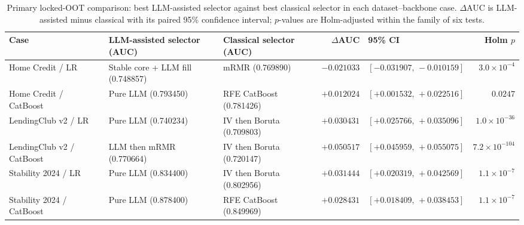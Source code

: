 \documentclass[preprint,12pt]{elsarticle}
\begin{document}
\begin{table}
\centering
\scriptsize
\setlength{\tabcolsep}{4pt}
\begin{threeparttable}
\caption{Primary locked-OOT comparison: best LLM-assisted selector against best classical selector in each dataset--backbone case. $\Delta$AUC is LLM-assisted minus classical with its paired 95\% confidence interval; $p$-values are Holm-adjusted within the family of six tests.}
\label{tab:primary_results}
\begin{tabular}{@{}lllrlr@{}}
\toprule
Case & LLM-assisted selector (AUC) & Classical selector (AUC) & $\Delta$AUC & 95\% CI & Holm $p$ \\
\midrule
Home Credit / LR & Stable core + LLM fill (0.748857) & mRMR (0.769890) & $-0.021033$ & $[-0.031907,\,-0.010159]$ & $3.0\times10^{-4}$ \\
Home Credit / CatBoost & Pure LLM (0.793450) & RFE CatBoost (0.781426) & $+0.012024$ & $[+0.001532,\,+0.022516]$ & $0.0247$ \\
LendingClub v2 / LR & Pure LLM (0.740234) & IV then Boruta (0.709803) & $+0.030431$ & $[+0.025766,\,+0.035096]$ & $1.0\times10^{-36}$ \\
LendingClub v2 / CatBoost & LLM then mRMR (0.770664) & IV then Boruta (0.720147) & $+0.050517$ & $[+0.045959,\,+0.055075]$ & $7.2\times10^{-104}$ \\
Stability 2024 / LR & Pure LLM (0.834400) & IV then Boruta (0.802956) & $+0.031444$ & $[+0.020319,\,+0.042569]$ & $1.1\times10^{-7}$ \\
Stability 2024 / CatBoost & Pure LLM (0.878400) & RFE CatBoost (0.849969) & $+0.028431$ & $[+0.018409,\,+0.038453]$ & $1.1\times10^{-7}$ \\
\bottomrule
\end{tabular}
\end{threeparttable}
\end{table}
\end{document}
